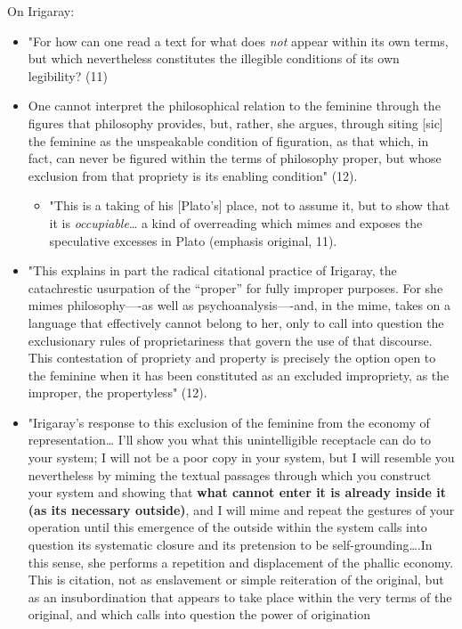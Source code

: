 \documentclass[11pt]{article}
\begin{document}
On Irigaray:
\begin{itemize}
\item "For how can one read a text for what does \emph{not} appear within its
own terms, but which nevertheless constitutes the illegible
conditions of its own legibility? (11)
\item One cannot interpret the philosophical relation to the feminine
through the figures that philosophy provides, but, rather, she
argues, through siting [sic] the feminine as the unspeakable
condition of figuration, as that which, in fact, can never be
figured within the terms of philosophy proper, but whose exclusion
from that propriety is its enabling condition" (12).
\begin{itemize}
\item "This is a taking of his [Plato's] place, not to assume it, but to
show that it is \emph{occupiable}\ldots{} a kind of overreading which mimes
and exposes the speculative excesses in Plato (emphasis original,
11).
\end{itemize}
\item "This explains in part the radical citational practice of Irigaray,
the catachrestic usurpation of the “proper” for fully improper
purposes. For she mimes philosophy—-as well as psychoanalysis—-and,
in the mime, takes on a language that effectively cannot belong to
her, only to call into question the exclusionary rules of
proprietariness that govern the use of that discourse. This
contestation of propriety and property is precisely the option open
to the feminine when it has been constituted as an excluded
impropriety, as the improper, the propertyless" (12).
\item "Irigaray’s response to this exclusion of the feminine from the
economy of representation\ldots{} I’ll show you what this unintelligible
receptacle can do to your system; I will not be a poor copy in your
system, but I will resemble you nevertheless by miming the textual
passages through which you construct your system and showing that
\textbf{what cannot enter it is already inside it (as its necessary
outside)}, and I will mime and repeat the gestures of your operation
until this emergence of the outside within the system calls into
question its systematic closure and its pretension to be
self-grounding\ldots{}.In this sense, she performs a repetition and
displacement of the phallic economy. This is citation, not as
enslavement or simple reiteration of the original, but as an
insubordination that appears to take place within the very terms of
the original, and which calls into question the power of origination

\end{itemize}
\end{document}
